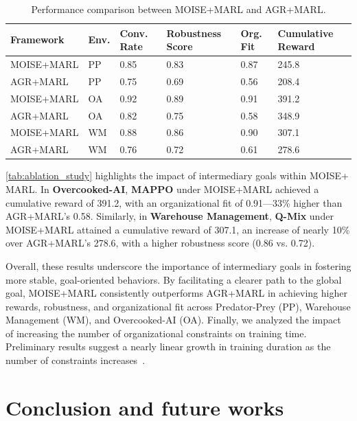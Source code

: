\documentclass[sigconf]{aamas}
\begin{document}
\begin{table}[h!]
    \centering
    \caption{Performance comparison between MOISE+MARL and AGR+MARL.}
    \label{tab:ablation_study}
    \small
    \renewcommand{\arraystretch}{1.1}
    \begin{tabular}{p{2cm}p{0.5cm}p{0.6cm}p{1.3cm}p{0.6cm}p{1.3cm}}
        \hline
        \textbf{Framework} & \textbf{Env.} & \textbf{Conv. Rate} & \textbf{Robustness Score} & \textbf{Org. Fit} & \textbf{Cumulative Reward} \\ \hline
        MOISE+MARL & PP & 0.85 & 0.83 & 0.87 & 245.8 \\
        AGR+MARL & PP & 0.75 & 0.69 & 0.56 & 208.4 \\
        MOISE+MARL & OA & 0.92 & 0.89 & 0.91 & 391.2 \\
        AGR+MARL & OA & 0.82 & 0.75 & 0.58 & 348.9 \\
        MOISE+MARL & WM & 0.88 & 0.86 & 0.90 & 307.1 \\
        AGR+MARL & WM & 0.76 & 0.72 & 0.61 & 278.6 \\ \hline
    \end{tabular}
\end{table}

\noindent \autoref{tab:ablation_study} highlights the impact of intermediary goals within MOISE+ MARL. In \textbf{Overcooked-AI}, \textbf{MAPPO} under MOISE+MARL achieved a cumulative reward of 391.2, with an organizational fit of 0.91—33\% higher than AGR+MARL's 0.58. Similarly, in \textbf{Warehouse Management}, \textbf{Q-Mix} under MOISE+MARL attained a cumulative reward of 307.1, an increase of nearly 10\% over AGR+MARL's 278.6, with a higher robustness score (0.86 vs. 0.72).

Overall, these results underscore the importance of intermediary goals in fostering more stable, goal-oriented behaviors. By facilitating a clearer path to the global goal, MOISE+MARL consistently outperforms AGR+MARL in achieving higher rewards, robustness, and organizational fit across Predator-Prey (PP), Warehouse Management (WM), and Overcooked-AI (OA).
Finally, we analyzed the impact of increasing the number of organizational constraints on training time. Preliminary results suggest a nearly linear growth in training duration as the number of constraints increases~\footnotemark[1].

\section{Conclusion and future works}
\label{sec:discussion_conclusion_future_work}
\end{document}
